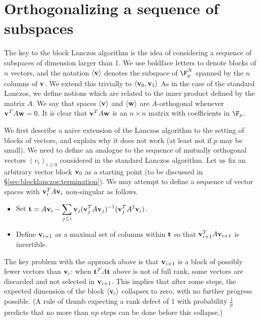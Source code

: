 \section{Orthogonalizing a sequence of subspaces}

The key to the block Lanczos algorithm is the idea of considering a
sequence of subspaces of dimension larger than 1. We use boldface letters
to denote blocks of $n$ vectors, and the notation
$\langle\mathbf{v} \rangle$ denotes the subspace of $\F_p^N$ spanned by
the $n$ columns of $\mathbf{v}$. We extend this trivially to
$\langle\mathbf{v}_0,\mathbf{v}_1\rangle$
As in the case of the standard Lanczos,
we define notions which are related to the inner product defined by the
matrix $A$. We say that spaces $\langle\mathbf{v} \rangle$ and
$\langle\mathbf{w} \rangle$ are $A$-orthogonal whenever $\mathbf{v} ^TA\mathbf{w} =0$. It is
clear that $\mathbf{v} ^TA\mathbf{w} $ is an $n\times n$ matrix with
coefficients in $\F_p$.

We first describe a naive extension of the Lanczos algorithm to the
setting of blocks of vectors, and explain why it does not work (at least
not if $p$ may be small).
We need to define an analogue to the sequence of mutually orthogonal
vectors $(v_i)_{i\geq0}$ considered in the standard Lanczos algorithm.
Let us fix an arbitrary vector block  $\mathbf{v}_0$ as a starting point (to be
discussed in §\ref{sec:blocklanczos:termination}).
We may attempt to define a sequence of vector spaces with
$\mathbf{v}_i^TA\mathbf{v}_i$ non-singular as follows.
\begin{itemize}
    \item Set $\displaystyle\mathbf{t} =
        A\mathbf{v}_i-
        \sum_{j\leq i}
        \mathbf v_j
        (\mathbf v_j^TA\mathbf v_j)^{-1}
        (\mathbf v_j^TA^2\mathbf v_i)
        $.
    \item Define $\mathbf{v}_{i+1}$ as a maximal set of columns within
        $\mathbf{t} $ so that $\mathbf{v}_{i+1}^TA\mathbf{v}_{i+1}$ is
        invertible.
\end{itemize}
The key problem with the approach above is that $\mathbf{v}_{i+1}$ is
a block of possibly fewer vectors than $\mathbf{v}_{i}$: when
$\mathbf{t} ^TA\mathbf{t} $ above is not of full rank, some vectors are
discarded and not selected in $\mathbf{v}_{i+1}$. This implies that
after
some steps, the expected dimension of the block
$\langle\mathbf{v}_i\rangle$ collapses to zero, with no further progress
possible. (A rule of thumb expecting a rank defect of 1 with
probability $\frac1p$ predicts that no more than $np$ steps can be done
before this collapse.)



